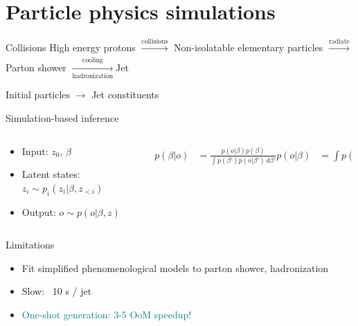 \documentclass[aspectratio=169,xcolor=dvipsnames]{beamer}
\begin{document}
\begin{frame}[plain]
  \titlepage
\end{frame}

\begin{frame}[plain]
  \tableofcontents
\end{frame}

\section{Particle physics simulations}
\begin{frame}{Collisions}
  \centering
  High energy protons \pause $\xrightarrow[]{\text{collisions}}$ Non-isolatable elementary particles \pause $\xrightarrow[]{\text{radiate}}$ Parton shower \pause $\xrightarrow[\text{hadronization}]{\text{cooling}}$Jet

  \vspace{1.5cm}

  \pause Initial particles $\rightarrow$ Jet constituents
\end{frame}

\begin{frame}{Simulation-based inference}
  \begin{columns}
    \begin{column}{0.5\textwidth}
      \begin{itemize}
        \item Input: $z_0$, $\beta$
        \pause
        \item Latent states: $z_i \sim p_i (z_i | \beta, z_{<i})$
        \pause
        \item Output: $o \sim p(o | \beta, z)$
      \end{itemize}
    \end{column}
    \pause
    \begin{column}{0.5\textwidth}
      \begin{align*}
        p(\beta | o) &= \frac{p(o|\beta)p(\beta)}{\int p(\beta') p(o | \beta') \, d\beta'}
        p(o | \beta) &= \int  p(x, \beta | \theta) dz
      \end{align*}
    \end{column}
  \end{columns}
  
  \end{frame}

\begin{frame}{Limitations}
  \begin{itemize}
    \item Fit simplified phenomenological models to parton shower, hadronization
    \pause
    \item Slow: ~10 s / jet
    \pause
    \item \textcolor{teal}{One-shot generation: 3-5 OoM speedup!}
  \end{itemize}
\end{frame}
\end{document}
